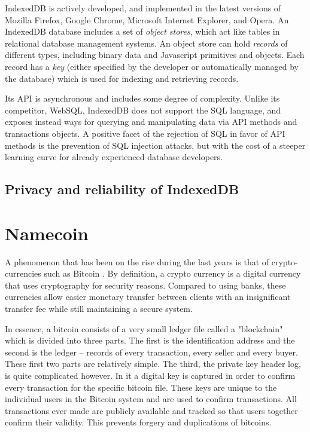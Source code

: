 IndexedDB is actively developed, and implemented in the latest versions of Mozilla Firefox, Google Chrome, Microsoft Internet Explorer, and Opera. An IndexedDB database includes a set of \emph{object stores}, which act like tables in relational database management systems. An object store can hold \emph{records} of different types, including binary data and Javascript primitives and objects. Each record has a \emph{key} (either specified by the developer or automatically managed by the database) which is used for indexing and retrieving records.

Its API is asynchronous and includes some degree of complexity. Unlike its competitor, WebSQL, IndexedDB does not support the SQL language, and exposes instead ways for querying and manipulating data via API methods and transactions objects. A positive facet of the rejection of SQL in favor of API methods is the prevention of SQL injection attacks, but with the cost of a steeper learning curve for already experienced database developers.

\subsection{Privacy and reliability of IndexedDB}

\section{Namecoin}
A phenomenon that has been on the rise during the last years is that of crypto-currencies such as Bitcoin \cite{CryptoCoinInsider:2014:Online}. By definition, a crypto currency is a digital currency that uses cryptography for security reasons. Compared to using banks, these currencies allow easier monetary transfer between clients with an insignificant transfer fee while still maintaining a secure system.

In essence, a bitcoin consists of a very small ledger file called a "blockchain" which is divided into three parts\cite{InternetForBeginners:2014:Online}. The first is the identification address and the second is the ledger – records of every transaction, every seller and every buyer. These first two parts are relatively simple. The third, the private key header log, is quite complicated however. In it a digital key is captured in order to confirm every transaction for the specific bitcoin file. These keys are unique to the individual users in the Bitcoin system and are used to confirm transactions. All transactions ever made are publicly available and tracked so that users together confirm their validity. This prevents forgery and duplications of bitcoins.

